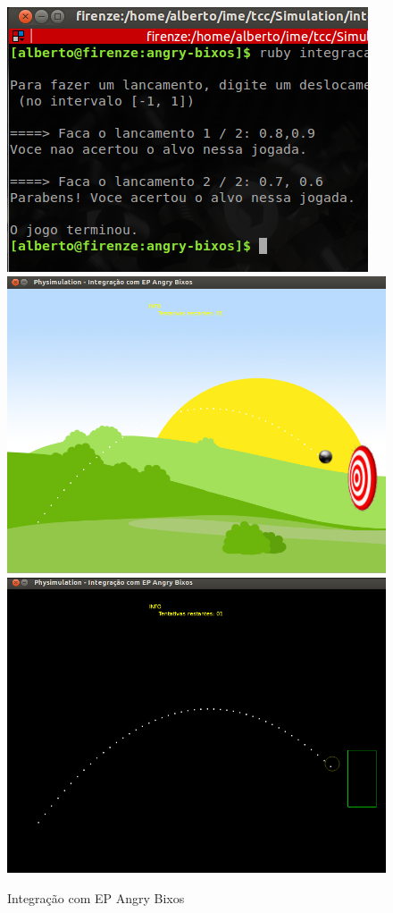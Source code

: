 \begin{figure}[H]
    \centering
	\includegraphics[scale=0.6]{images/angry-bixos-3.png}
	\includegraphics[scale=0.22]{images/angry-bixos-4.png}
	\includegraphics[scale=0.22]{images/angry-bixos-4E.png}
	\caption{Integração com EP Angry Bixos}
\end{figure}

